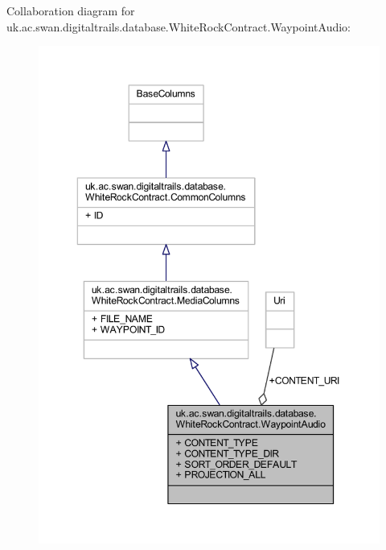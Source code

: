 Collaboration diagram for uk.\+ac.\+swan.\+digitaltrails.\+database.\+White\+Rock\+Contract.\+Waypoint\+Audio\+:
\nopagebreak
\begin{figure}[H]
\begin{center}
\leavevmode
\includegraphics[width=350pt]{classuk_1_1ac_1_1swan_1_1digitaltrails_1_1database_1_1_white_rock_contract_1_1_waypoint_audio__coll__graph}
\end{center}
\end{figure}
